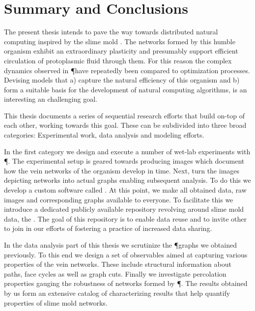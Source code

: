 \chapter{Summary and Conclusions}

	
	The present thesis intends to pave the way towards distributed natural computing inspired by the slime mold \Pp. The networks formed by this humble organism exhibit an extraordinary plasticity and presumably support efficient circulation of protoplasmic fluid through them. For this reason the complex dynamics observed in \P have repeatedly been compared to optimization processes. 
	Devising models that a) capture the natural efficiency of this organism and b) form a suitable basis for the development of natural computing algorithms, is an interesting an challenging goal.
	
	This thesis documents a series of sequential research efforts that build on-top of each other, working towards this goal. These can be subdivided into three broad categories: Experimental work, data analysis and modeling efforts.

	In the first category we design and execute a number of wet-lab experiments with \P. The experimental setup is geared towards producing images which document how the vein networks of the organism develop in time. Next, turn the images depicting networks into actual graphs enabling  subsequent analysis. To do this we develop a custom software called \NEFI. At this point, we make all obtained data, \ie raw images and corresponding graphs available to everyone. To facilitate this we introduce a dedicated publicly available repository revolving around slime mold data, the \SMGR. The goal of this repository is to enable data reuse and to invite other to join in our efforts of fostering a practice of increased data sharing.

	In the data analysis part of this thesis we scrutinize the \P graphs we obtained previously. To this end we design a set of observables aimed at capturing various properties of the vein networks. These include structural information about paths, face cycles as well as graph cuts. Finally we investigate percolation properties gauging the robustness of networks formed by \P. The results obtained by us form an extensive catalog of characterizing results that help quantify properties of slime mold networks.

